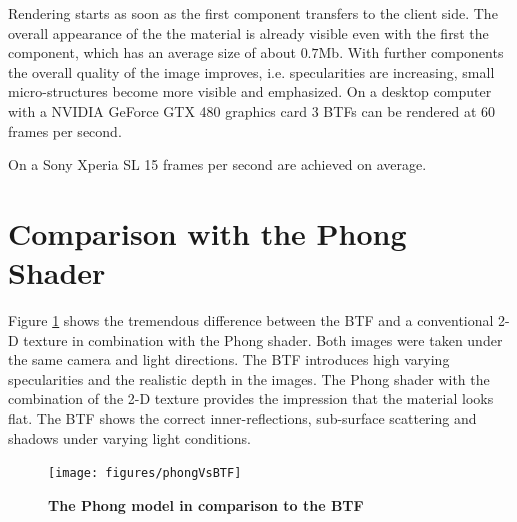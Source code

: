 Rendering starts as soon as the first component transfers to the client side.
 The overall appearance of the the material is already visible even with the first the component, which has an average size of about $0.7$Mb.
With further components the overall quality of the image improves, i.e. specularities are increasing, small micro-structures become more visible and emphasized.
On a desktop computer with a NVIDIA GeForce GTX 480 graphics card 3 BTFs can be rendered at 60 frames per second.

On a Sony Xperia SL 15 frames per second are achieved on average.


\section{Comparison with the Phong Shader}
\label{section:eval_streaming}

Figure \ref{fig:phongvsbtf} shows the tremendous difference between the BTF and a conventional 2-D texture in combination with the Phong shader.
Both images were taken under the same camera and light directions. The BTF introduces high varying specularities and the realistic depth in the images.
The Phong shader with the combination of the 2-D texture provides the impression that the material looks flat.
The BTF shows the correct inner-reflections, sub-surface scattering and shadows under varying light conditions.

\begin{figure}[h]
 \centering
 \texttt{[image: figures/phongVsBTF]}
 \caption[The Phong model in comparison to the BTF ] {
 	{\bf The Phong model in comparison to the BTF  }
	}
 \label{fig:phongvsbtf}
\end{figure}


